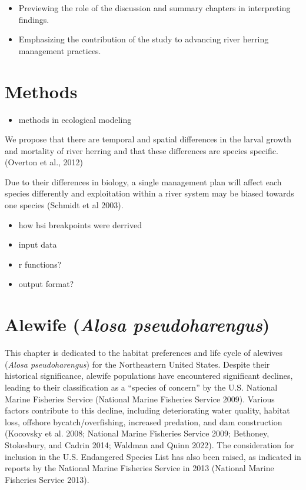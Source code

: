 \documentclass[
]{book}
\providecommand{\tightlist}{%
  \setlength{\itemsep}{0pt}\setlength{\parskip}{0pt}}
\begin{document}
\begin{itemize}
\tightlist
\item
  Previewing the role of the discussion and summary chapters in interpreting findings.
\item
  Emphasizing the contribution of the study to advancing river herring management practices.
\end{itemize}

\hypertarget{cross}{%
\chapter{Methods}\label{cross}}

\begin{itemize}
\tightlist
\item
  methods in ecological modeling
\end{itemize}

We propose that there are temporal and spatial differences in the larval growth and mortality of river herring and that these differences are species specific. (Overton et al., 2012)

Due to their differences in biology, a single management plan will affect each species differently and exploitation within a river system may be biased towards one species (Schmidt et al 2003).

\begin{itemize}
\item
  how hsi breakpoints were derrived
\item
  input data
\item
  r functions?
\item
  output format?
\end{itemize}

\hypertarget{alewife-alosa-pseudoharengus}{%
\chapter{\texorpdfstring{Alewife (\emph{Alosa pseudoharengus})}{Alewife (Alosa pseudoharengus)}}\label{alewife-alosa-pseudoharengus}}

This chapter is dedicated to the habitat preferences and life cycle of alewives (\emph{Alosa pseudoharengus}) for the Northeastern United States. Despite their historical significance, alewife populations have encountered significant declines, leading to their classification as a ``species of concern'' by the U.S. National Marine Fisheries Service (National Marine Fisheries Service 2009). Various factors contribute to this decline, including deteriorating water quality, habitat loss, offshore bycatch/overfishing, increased predation, and dam construction (Kocovsky et al. 2008; National Marine Fisheries Service 2009; Bethoney, Stokesbury, and Cadrin 2014; Waldman and Quinn 2022). The consideration for inclusion in the U.S. Endangered Species List has also been raised, as indicated in reports by the National Marine Fisheries Service in 2013 (National Marine Fisheries Service 2013).
\end{document}
